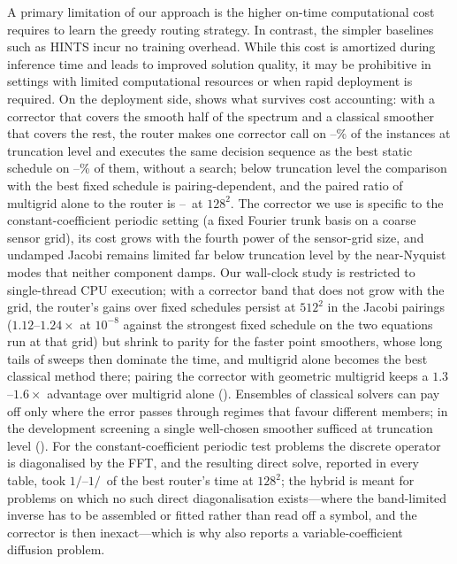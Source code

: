 \documentclass{article}
\newcommand{\edit}[1]{{\color{red}#1}}
\begin{document}
A primary limitation of our approach is the higher on-time computational cost requires to learn the greedy routing strategy. In contrast, the simpler baselines such as HINTS incur no training overhead. While this cost is amortized during inference time and leads to improved solution quality, it may be prohibitive in settings with limited computational resources or when rapid deployment is required. \edit{On the deployment side,  shows what survives cost accounting: with a corrector that covers the smooth half of the spectrum and a classical smoother that covers the rest, the router makes one corrector call on \caOneCallMin--\caOneCallMax\% of the instances at truncation level and executes the same decision sequence as the best static schedule on \caAgreeBestMin--\caAgreeBestMax\% of them, without a search; below truncation level the comparison with the best fixed schedule is pairing-dependent, and the paired ratio of multigrid alone to the router is \caVsMgDeepMin--\caVsMgDeepMax\ at $128^2$. The corrector we use is specific to the constant-coefficient periodic setting (a fixed Fourier trunk basis on a coarse sensor grid), its cost grows with the fourth power of the sensor-grid size, and undamped Jacobi remains limited far below truncation level by the near-Nyquist modes that neither component damps. Our wall-clock study is restricted to single-thread CPU execution; with a corrector band that does not grow with the grid, the router's gains over fixed schedules persist at $512^2$ in the Jacobi pairings ($1.12$--$1.24\times$ at $10^{-8}$ against the strongest fixed schedule on the two equations run at that grid) but shrink to parity for the faster point smoothers, whose long tails of sweeps then dominate the time, and multigrid alone becomes the best classical method there; pairing the corrector with geometric multigrid keeps a $1.3$--$1.6\times$ advantage over multigrid alone (\Cref{sec:wallclock}). Ensembles of classical solvers can pay off only where the error passes through regimes that favour different members; in the development screening a single well-chosen smoother sufficed at truncation level (\Cref{sec:wallclock_ens}). For the constant-coefficient periodic test problems the discrete operator is diagonalised by the FFT, and the resulting direct solve, reported in every table, took $1/$\caFftRatioMax--$1/$\caFftRatioMin\ of the best router's time at $128^2$; the hybrid is meant for problems on which no such direct diagonalisation exists---where the band-limited inverse has to be assembled or fitted rather than read off a symbol, and the corrector is then inexact---which is why \Cref{sec:wallclock} also reports a variable-coefficient diffusion problem.}
\end{document}
